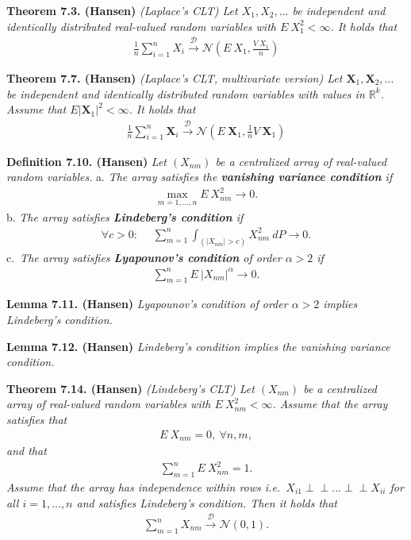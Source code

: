 \documentclass[
]{book}
\begin{document}
\textbf{Theorem 7.3. (Hansen)} \emph{(Laplace's CLT) Let \(X_1,X_2,...\) be independent and identically distributed real-valued random variables with \(E\ X_1^2<\infty\). It holds that}
\begin{align*}
    \frac{1}{n}\sum_{i=1}^nX_i\stackrel{\mathcal{D}}{\to} \mathcal{N}\left(E\ X_1,\frac{V\ X_1}{n}\right)\tag{7.4}
\end{align*}

\textbf{Theorem 7.7. (Hansen)} \emph{(Laplace's CLT, multivariate version) Let \(\mathbf{X}_1,\mathbf{X}_2,...\) be independent and identically distributed random variables with values in \(\mathbb{R}^k\). Assume that \(E\vert \mathbf{X}_1\vert^2<\infty\). It holds that}
\begin{align*}
    \frac{1}{n}\sum_{i=1}^n\mathbf{X}_i\stackrel{\mathcal{D}}{\to} \mathcal{N}\left(E\ \mathbf{X}_1,\frac{1}{n}V\ \mathbf{X}_1\right)\tag{7.7}
\end{align*}

\textbf{Definition 7.10. (Hansen)} \emph{Let \((X_{nm})\) be a centralized array of real-valued random variables.}
a. \emph{The array satisfies the \textbf{vanishing variance condition} if}
\begin{align*}
      \max_{m=1,...,n}E\ X_{nm}^2\to 0.\tag{7.8}
  \end{align*}
b. \emph{The array satisfies \textbf{Lindeberg's condition} if}
\begin{align*}
      \forall c>0:\hspace{15pt}\sum_{m=1}^n\int_{(\vert X_{nm}\vert>c)}X_{nm}^2\ dP\to 0.\tag{7.9}
  \end{align*}
c.~\emph{The array satisfies \textbf{Lyapounov's condition} of order \(\alpha>2\) if}
\begin{align*}
      \sum_{m=1}^nE\ \vert X_{nm}\vert ^\alpha\to 0.\tag{7.10}
  \end{align*}

\textbf{Lemma 7.11. (Hansen)} \emph{Lyapounov's condition of order \(\alpha>2\) implies Lindeberg's condition.}

\textbf{Lemma 7.12. (Hansen)} \emph{Lindeberg's condition implies the vanishing variance condition.}

\textbf{Theorem 7.14. (Hansen)} \emph{(Lindeberg's CLT) Let \((X_{nm})\) be a centralized array of real-valued random variables with \(E\ X_{nm}^2<\infty\). Assume that the array satisfies that}
\begin{align*}
    E\ X_{nm}=0,\ \forall n,m,
\end{align*}
\emph{and that}
\begin{align*}
    \sum_{m=1}^n E\ X^2_{nm}=1.\tag{7.13}
\end{align*}
\emph{Assume that the array has independence within rows i.e.~\(X_{i1}\perp \!\!\! \perp ... \perp \!\!\! \perp X_{ii}\) for all \(i=1,...,n\) and satisfies Lindeberg's condition. Then it holds that}
\begin{align*}
    \sum_{m=1}^nX_{nm}\stackrel{\mathcal{D}}{\to} \mathcal{N}(0,1).
\end{align*}
\end{document}
